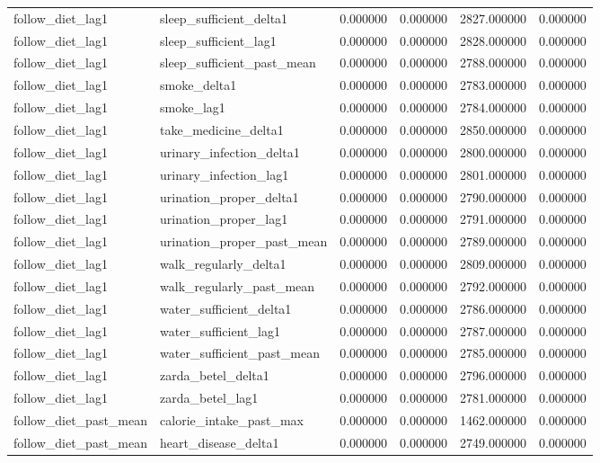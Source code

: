 \begin{longtable}{llrrrr}
follow\_diet\_lag1 & sleep\_sufficient\_delta1 & 0.000000 & 0.000000 & 2827.000000 & 0.000000 \\
follow\_diet\_lag1 & sleep\_sufficient\_lag1 & 0.000000 & 0.000000 & 2828.000000 & 0.000000 \\
follow\_diet\_lag1 & sleep\_sufficient\_past\_mean & 0.000000 & 0.000000 & 2788.000000 & 0.000000 \\
follow\_diet\_lag1 & smoke\_delta1 & 0.000000 & 0.000000 & 2783.000000 & 0.000000 \\
follow\_diet\_lag1 & smoke\_lag1 & 0.000000 & 0.000000 & 2784.000000 & 0.000000 \\
follow\_diet\_lag1 & take\_medicine\_delta1 & 0.000000 & 0.000000 & 2850.000000 & 0.000000 \\
follow\_diet\_lag1 & urinary\_infection\_delta1 & 0.000000 & 0.000000 & 2800.000000 & 0.000000 \\
follow\_diet\_lag1 & urinary\_infection\_lag1 & 0.000000 & 0.000000 & 2801.000000 & 0.000000 \\
follow\_diet\_lag1 & urination\_proper\_delta1 & 0.000000 & 0.000000 & 2790.000000 & 0.000000 \\
follow\_diet\_lag1 & urination\_proper\_lag1 & 0.000000 & 0.000000 & 2791.000000 & 0.000000 \\
follow\_diet\_lag1 & urination\_proper\_past\_mean & 0.000000 & 0.000000 & 2789.000000 & 0.000000 \\
follow\_diet\_lag1 & walk\_regularly\_delta1 & 0.000000 & 0.000000 & 2809.000000 & 0.000000 \\
follow\_diet\_lag1 & walk\_regularly\_past\_mean & 0.000000 & 0.000000 & 2792.000000 & 0.000000 \\
follow\_diet\_lag1 & water\_sufficient\_delta1 & 0.000000 & 0.000000 & 2786.000000 & 0.000000 \\
follow\_diet\_lag1 & water\_sufficient\_lag1 & 0.000000 & 0.000000 & 2787.000000 & 0.000000 \\
follow\_diet\_lag1 & water\_sufficient\_past\_mean & 0.000000 & 0.000000 & 2785.000000 & 0.000000 \\
follow\_diet\_lag1 & zarda\_betel\_delta1 & 0.000000 & 0.000000 & 2796.000000 & 0.000000 \\
follow\_diet\_lag1 & zarda\_betel\_lag1 & 0.000000 & 0.000000 & 2781.000000 & 0.000000 \\
follow\_diet\_past\_mean & calorie\_intake\_past\_max & 0.000000 & 0.000000 & 1462.000000 & 0.000000 \\
follow\_diet\_past\_mean & heart\_disease\_delta1 & 0.000000 & 0.000000 & 2749.000000 & 0.000000 \\

\end{longtable}
